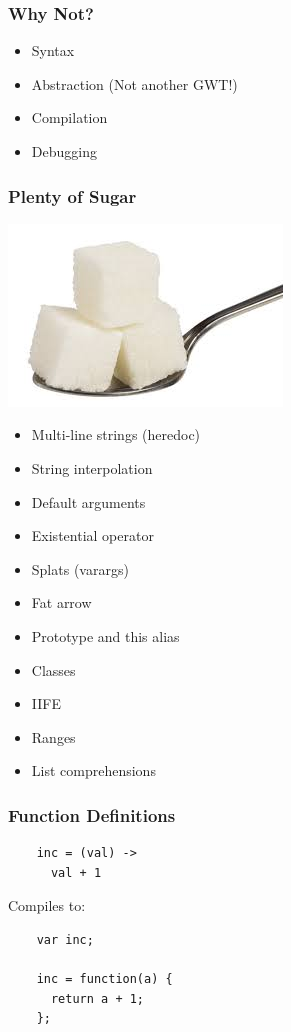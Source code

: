 \documentclass{beamer}
\begin{document}
\begin{frame}
  \frametitle{Why Not?}
  \begin{itemize}
    \pause
    \item Syntax
    \pause
    \item Abstraction (Not another GWT!)
    \pause
    \item Compilation
    \pause
    \item Debugging
    \pause
  \end{itemize}
\end{frame}



\begin{frame}
  \frametitle{Plenty of Sugar}
  \includegraphics[scale=.40]{sugar}
%
%
  \begin{multicols}{2}
  \begin{itemize}
    \item Multi-line strings (heredoc)
    \item String interpolation
    \item Default arguments
    \item Existential operator
    \item Splats (varargs)
    \item Fat arrow
    \item Prototype and this alias
    \item Classes
    \item IIFE
    \item Ranges
    \item List comprehensions
  \end{itemize}
  \end{multicols}
\end{frame}

\begin{frame}[fragile]
  \frametitle{Function Definitions}

  \begin{verbatim}
    inc = (val) ->
      val + 1
  \end{verbatim}

  \pause
  \vspace{.5cm}
  Compiles to:
  \vspace{.5cm}

  \begin{verbatim}
    var inc;

    inc = function(a) {
      return a + 1;
    };    
  \end{verbatim}  
\end{frame}
\end{document}
